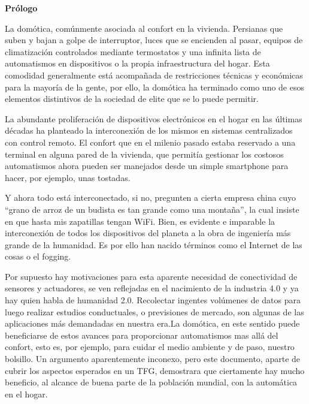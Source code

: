 
\newpage

\thispagestyle{empty}
\begin{center}

{\bf \Huge Prólogo}
\end{center}
\vspace{1cm}


La domótica, comúnmente asociada al confort en la vivienda. Persianas que suben y bajan a golpe de interruptor, luces que se encienden al pasar, equipos de climatización controlados mediante termostatos y una infinita lista de automatismos en dispositivos o la propia infraestructura del hogar. Esta comodidad generalmente está acompañada de restricciones técnicas y económicas para la mayoría de la gente, por ello, la domótica ha terminado como uno de esos elementos distintivos de la sociedad de elite que se lo puede permitir.

La abundante proliferación de dispositivos electrónicos en el hogar en las últimas décadas ha planteado la interconexión de los mismos en sistemas centralizados con control remoto. El confort que en el milenio pasado estaba reservado a una terminal en alguna pared de la vivienda, que permitía gestionar los costosos automatismos ahora pueden ser manejados desde un simple smartphone para hacer, por ejemplo, unas tostadas.

Y ahora todo está interconectado, si no, pregunten a cierta empresa china cuyo “grano de arroz de un budista es tan grande como una montaña”, la cual insiste en que hasta mis zapatillas tengan WiFi. Bien, es evidente e imparable la interconexión de todos los dispositivos del planeta a la obra de ingeniería más grande de la humanidad. Es por ello han nacido términos como el Internet de las cosas o el fogging.

Por supuesto hay motivaciones para esta aparente necesidad de conectividad de sensores y actuadores, se ven reflejadas en el nacimiento de la industria 4.0 y ya hay quien habla de humanidad 2.0. Recolectar ingentes volúmenes de datos para luego realizar estudios conductuales, o previsiones de mercado, son algunas de las aplicaciones más demandadas en nuestra era.La domótica, en este sentido puede beneficiarse de estos avances para proporcionar automatismos mas allá del confort, esto es, por ejemplo, para cuidar el medio ambiente y de paso, nuestro bolsillo. Un argumento aparentemente inconexo, pero este documento, aparte de cubrir los aspectos esperados en un TFG, demostrara que ciertamente hay mucho beneficio, al alcance de buena parte de la población mundial, con la automática en el hogar.
